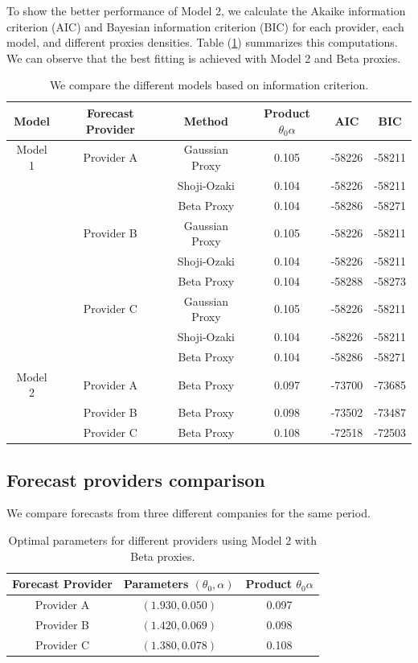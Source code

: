 \documentclass[11pt]{article}
\theoremstyle{definition}
\begin{document}
To show the better performance of Model 2, we calculate the Akaike information criterion (AIC) and Bayesian information criterion (BIC) for each provider, each model, and different proxies densities. Table (\ref{tab:model_comparison}) summarizes this computations. We can observe that the best fitting is achieved with Model 2 and Beta proxies.

\begin{table}[H]
\centering
\begin{tabular}{cccccc}
\toprule
Model & Forecast Provider & Method & Product $\theta_0\alpha$   & AIC & BIC \\ \midrule
Model 1 & Provider A & Gaussian Proxy & 0.105 & -58226 & -58211 \\
 &  & Shoji-Ozaki & 0.104 & -58226 & -58211 \\
 &  & Beta Proxy & 0.104 & -58286 & -58271 \\
 & Provider B & Gaussian Proxy & 0.105 & -58226   & -58211 \\
 &  & Shoji-Ozaki & 0.104 & -58226 & -58211 \\
 &  & Beta Proxy & 0.104 & -58288 & -58273 \\
 & Provider C & Gaussian Proxy & 0.105 & -58226 & -58211 \\
 &  & Shoji-Ozaki & 0.104 & -58226 & -58211 \\
 &  & Beta Proxy & 0.104 & -58286 & -58271 \\
Model 2 & Provider A & Beta Proxy & 0.097 & -73700   & -73685 \\ 
 & Provider B & Beta Proxy & 0.098 &  -73502 & -73487 \\ 
 & Provider C & Beta Proxy & 0.108 & -72518 & -72503 \\ 
\bottomrule
\end{tabular}
\caption{We compare the different models based on information criterion.}
\label{tab:model_comparison}
\end{table}

\subsection{Forecast providers comparison} \label{Forecast_Comp}
We compare forecasts from three different companies for the same period.
\begin{table}[H]
\centering
\begin{tabular}{ccc}
\toprule
Forecast Provider & Parameters $(\theta_0, \alpha)$ & Product $\theta_0\alpha$ \\ \midrule
Provider A  & $(1.930,0.050)$  &  0.097 \\
Provider B  & $(1.420,0.069) $  &  0.098 \\ 
Provider C  & $(1.380,0.078) $  &  0.108 \\ 
\bottomrule
\end{tabular}
\caption{Optimal parameters for different providers using Model 2 with Beta proxies.}
\label{tab:forcast_comparison}
\end{table}
\end{document}
